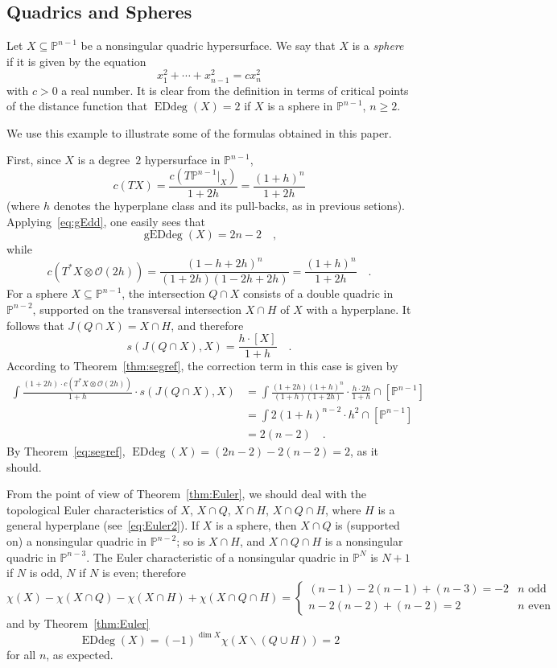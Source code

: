 \documentclass[11pt]{amsart}
\numberwithin{equation}{section}
\newcommand{\Pbb}{{\mathbb{P}}}
\newcommand{\cO}{{\mathscr O}}
\DeclareMathOperator{\Edd}{EDdeg}
\DeclareMathOperator{\gEdd}{gEDdeg}
\begin{document}
\subsection{Quadrics and Spheres}
Let $X\subseteq \Pbb^{n-1}$ be a nonsingular quadric hypersurface. We say that $X$ is
a {\em sphere\/} if it is given by the equation
\[
x_1^2+\cdots + x_{n-1}^2 = c x_n^2
\]
with $c>0$ a real number. It is clear from the definition in terms of critical points of the
distance function that $\Edd(X)=2$ if $X$ is a sphere in $\Pbb^{n-1}$, $n\ge 2$.

We use this example to illustrate some of the formulas obtained in this paper.

First, since $X$ is a degree~$2$ hypersurface in $\Pbb^{n-1}$,
\[
c(TX)=\frac{c(T\Pbb^{n-1}|_X)}{1+2h} = \frac{(1+h)^n}{1+2h}
\]
(where $h$ denotes the hyperplane class and its pull-backs, as in previous setions).
Applying~\eqref{eq:gEdd}, one easily sees that
\[
\gEdd(X) = 2n-2\quad,
\]
while
\[
c(T^*X\otimes \cO(2h))=\frac{(1-h+2h)^n}{(1+2h)(1-2h+2h)}=\frac{(1+h)^n}{1+2h}\quad.
\]
For a sphere $X\subseteq \Pbb^{n-1}$, the intersection $Q\cap X$ consists of a double 
quadric in $\Pbb^{n-2}$, supported on the transversal intersection $X\cap H$ of $X$ with a 
hyperplane. It follows that $J(Q\cap X)=X\cap H$, and therefore
\[
s(J(Q\cap X), X)=\frac {h\cdot [X]}{1+h}\quad.
\] 
According to Theorem~\ref{thm:segref}, the correction term in this case is given by 
\begin{align*}
\int \frac{(1+2h)\cdot c(T^*X\otimes \cO(2h))}{1+h}\cdot s(J(Q\cap X),X) 
&=\int \frac{(1+2h)(1+h)^n}{(1+h)(1+2h)}\cdot \frac {h\cdot 2h}{1+h}\cap [\Pbb^{n-1}] \\
&=\int 2(1+h)^{n-2}\cdot h^2 \cap [\Pbb^{n-1}]\\
&=2(n-2)\quad.
\end{align*}
By Theorem~\ref{eq:segref}, $\Edd(X)=(2n-2)-2(n-2) = 2$, as it should.

From the point of view of Theorem~\ref{thm:Euler}, we should deal with the topological
Euler characteristics of $X$, $X\cap Q$, $X\cap H$, $X\cap Q\cap H$, where $H$
is a general hyperplane (see~\eqref{eq:Euler2}). If $X$ is a sphere, then $X\cap Q$ is 
(supported on) a nonsingular quadric in $\Pbb^{n-2}$; so is $X\cap H$, and
$X\cap Q\cap H$ is a nonsingular quadric in $\Pbb^{n-3}$.
The Euler characteristic of a nonsingular quadric in $\Pbb^N$ is $N+1$ if $N$ is odd,
$N$ if $N$ is even; therefore
\[
\chi(X)-\chi(X\cap Q)-\chi(X\cap H)+\chi(X\cap Q\cap H) =
\begin{cases}
(n-1) -2(n-1) + (n-3) = -2 & \text{$n$ odd} \\
n -2(n-2) + (n-2) = 2 & \text{$n$ even}
\end{cases}
\]
and by Theorem~\ref{thm:Euler}
\[
\Edd(X) = (-1)^{\dim X} \chi(X\smallsetminus (Q\cup H)) = 2
\]
for all $n$, as expected.
\end{document}
